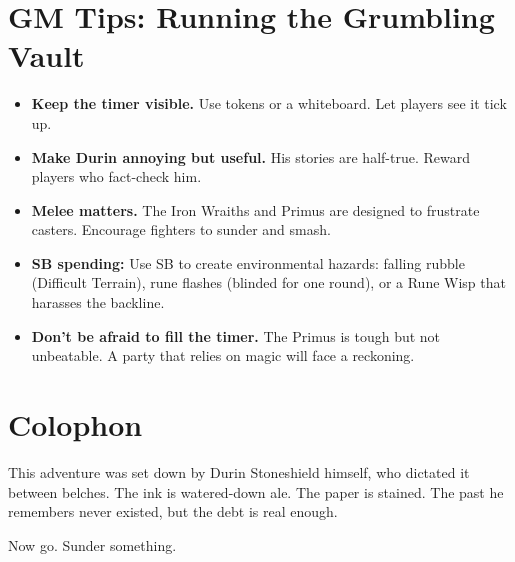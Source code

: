 \documentclass[11pt, a4paper]{article}
\begin{document}
\section*{GM Tips: Running the Grumbling Vault}

\begin{itemize}
\item \textbf{Keep the timer visible.} Use tokens or a whiteboard. Let players see it tick up.
\item \textbf{Make Durin annoying but useful.} His stories are half-true. Reward players who fact-check him.
\item \textbf{Melee matters.} The Iron Wraiths and Primus are designed to frustrate casters. Encourage fighters to sunder and smash.
\item \textbf{SB spending:} Use SB to create environmental hazards: falling rubble (Difficult Terrain), rune flashes (blinded for one round), or a Rune Wisp that harasses the backline.
\item \textbf{Don't be afraid to fill the timer.} The Primus is tough but not unbeatable. A party that relies on magic will face a reckoning.
\end{itemize}

\section*{Colophon}

This adventure was set down by Durin Stoneshield himself, who dictated it between belches. The ink is watered-down ale. The paper is stained. The past he remembers never existed, but the debt is real enough.

Now go. Sunder something.
\end{document}
